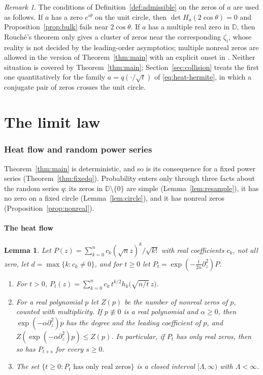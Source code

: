 \documentclass[11pt]{amsart}
\newtheorem{lemma}[theorem]{Lemma}
\theoremstyle{definition}
\theoremstyle{remark}
\newtheorem{remark}[theorem]{Remark}
\numberwithin{equation}{section}
\newcommand{\D}{\mathbb{D}}
\begin{document}
\begin{remark}\label{rem:hypotheses}
The conditions of Definition~\ref{def:admissible} on the zeros of $a$ are used as follows. If $a$ has a zero $e^{i\theta}$ on the unit circle, then $\det H_a(2\cos\theta)=0$ and Proposition~\ref{prop:bulk} fails near $2\cos\theta$. If $a$ has a multiple real zero in $\D$, then Rouch\'e's theorem only gives a cluster of zeros near the corresponding $\zeta_i$, whose reality is not decided by the leading-order asymptotics; multiple nonreal zeros are allowed in the version of Theorem~\ref{thm:main} with an explicit onset in \cite{CompA}. Neither situation is covered by Theorem~\ref{thm:main}; Section~\ref{sec:collision} treats the first one quantitatively for the family $a=q(\cdot/\sqrt t)$ of \eqref{eq:heat-hermite}, in which a conjugate pair of zeros crosses the unit circle. %
\end{remark}


\clearpage
\part{The limit law}

\section{Heat flow and random power series}\label{sec:heat}

Theorem~\ref{thm:main} is deterministic, and so is its consequence for a fixed power series (Theorem~\ref{thm:fixedq}). Probability enters only through three facts about the random series $q$: its zeros in $\D\setminus\{0\}$ are simple (Lemma~\ref{lem:resample}), it has no zero on a fixed circle (Lemma~\ref{lem:circle}), and it has nonreal zeros (Proposition~\ref{prop:nonreal}).

\subsection{The heat flow}\label{subsec:heatflow}

\begin{lemma}\label{lem:heat}
Let $P(z)=\sum_{k=0}^{n}c_k(\sqrt nz)^k/\sqrt{k!}$ with real coefficients $c_k$, not all zero, let $d=\max\{k:c_k\ne0\}$, and for $t\ge0$ let $P_t=\exp(-\frac t{2n}\partial_z^2)P$.
\begin{enumerate}
\item[(a)] For $t>0$, $P_t(z)=\sum_{k=0}^{n}c_k\,t^{k/2}h_k\bigl(\sqrt{n/t}\,z\bigr)$.
\item[(b)] For a real polynomial $p$ let $Z(p)$ be the number of nonreal zeros of $p$, counted with multiplicity. If $p\not\equiv0$ is a real polynomial and $\alpha\ge0$, then $\exp(-\alpha\partial_z^2)p$ has the degree and the leading coefficient of $p$, and $Z(\exp(-\alpha\partial_z^2)p)\le Z(p)$. In particular, if $P_t$ has only real zeros, then so has $P_{t+s}$ for every $s\ge0$.
\item[(c)] The set $\{t\ge0:P_t\text{ has only real zeros}\}$ is a closed interval $[\Lambda,\infty)$ with $\Lambda<\infty$.
\end{enumerate}
\end{lemma}
\end{document}
